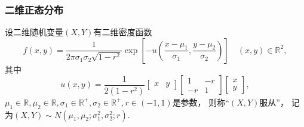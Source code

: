 \subsubsection{二维正态分布}
\begin{definition}
设二维随机变量\((X,Y)\)有二维密度函数
\begin{equation}
	f(x,y) = \frac{1}{2\pi\sigma_1\sigma_2\sqrt{1-r^2}}
		\exp\left[- u\left(
			\frac{x-\mu_1}{\sigma_1},
			\frac{y-\mu_2}{\sigma_2}
		\right)\right]
	\quad(x,y)\in\mathbb{R}^2,
\end{equation}
其中\begin{equation*}
	u(x,y)
	= \frac{1}{2(1-r^2)}
	\begin{bmatrix}
		x & y
	\end{bmatrix}
	\begin{bmatrix}
		1 & -r \\
		-r & 1
	\end{bmatrix}
	\begin{bmatrix}
		x \\ y
	\end{bmatrix},
\end{equation*}
\(\mu_1\in\mathbb{R},
\mu_2\in\mathbb{R},
\sigma_1\in\mathbb{R}^+,
\sigma_2\in\mathbb{R}^+,
r\in(-1,1)\)是参数，
则称“\((X,Y)\)服从”，
记为\((X,Y) \sim N(\mu_1,\mu_2;\sigma_1^2,\sigma_2^2;r)\).
\end{definition}

